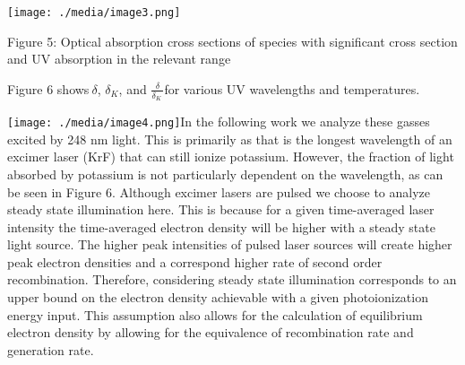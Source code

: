 \texttt{[image: ./media/image3.png]}

Figure 5: Optical absorption cross sections of species with significant cross section and UV absorption in the relevant range

Figure 6 shows\(\ \delta\), \(\delta_{K}\), and \(\frac{\delta}{\delta_{K}\ }\)for various UV wavelengths and temperatures.

\texttt{[image: ./media/image4.png]}In the following work we analyze these gasses excited by 248 nm light. This is primarily as that is the longest wavelength of an excimer laser (KrF) that can still ionize potassium. However, the fraction of light absorbed by potassium is not particularly dependent on the wavelength, as can be seen in Figure 6. Although excimer lasers are pulsed we choose to analyze steady state illumination here. This is because for a given time-averaged laser intensity the time-averaged electron density will be higher with a steady state light source. The higher peak intensities of pulsed laser sources will create higher peak electron densities and a correspond higher rate of second order recombination. Therefore, considering steady state illumination corresponds to an upper bound on the electron density achievable with a given photoionization energy input. This assumption also allows for the calculation of equilibrium electron density by allowing for the equivalence of recombination rate and generation rate.
